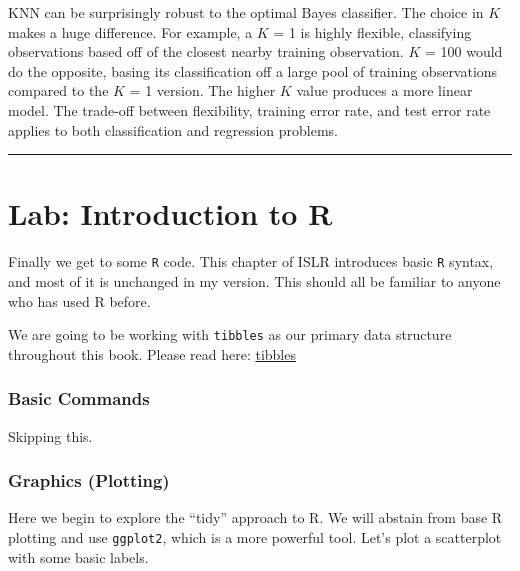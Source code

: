 \documentclass[]{book}
\begin{document}
KNN can be surprisingly robust to the optimal Bayes classifier. The choice in \(K\) makes a huge difference. For example, a \(K\) = 1 is highly flexible, classifying observations based off of the closest nearby training observation. \(K\) = 100 would do the opposite, basing its classification off a large pool of training observations compared to the \(K\) = 1 version. The higher \(K\) value produces a more linear model. The trade-off between flexibility, training error rate, and test error rate applies to both classification and regression problems.

\begin{center}\rule{0.5\linewidth}{\linethickness}\end{center}

\hypertarget{lab-introduction-to-r}{%
\section{Lab: Introduction to R}\label{lab-introduction-to-r}}

Finally we get to some \texttt{R} code. This chapter of ISLR introduces basic \texttt{R} syntax, and most of it is unchanged in my version. This should all be familiar to anyone who has used R before.

We are going to be working with \texttt{tibbles} as our primary data structure throughout this book. Please read here: \href{http://r4ds.had.co.nz/tibbles.html}{tibbles}

\hypertarget{basic-commands}{%
\subsubsection{Basic Commands}\label{basic-commands}}

Skipping this.

\hypertarget{graphics-plotting}{%
\subsubsection{Graphics (Plotting)}\label{graphics-plotting}}

Here we begin to explore the ``tidy'' approach to R. We will abstain from base R plotting and use \texttt{ggplot2}, which is a more powerful tool. Let's plot a scatterplot with some basic labels.
\end{document}
